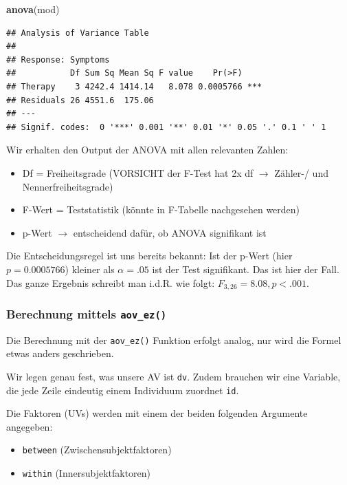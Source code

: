\documentclass[
]{book}
\newenvironment{Shaded}{\begin{snugshade}}{\end{snugshade}}
\newcommand{\FunctionTok}[1]{\textcolor[rgb]{0.13,0.29,0.53}{\textbf{#1}}}
\newcommand{\NormalTok}[1]{#1}
\providecommand{\tightlist}{%
  \setlength{\itemsep}{0pt}\setlength{\parskip}{0pt}}
\begin{document}
\begin{Shaded}
\begin{Highlighting}[]
\FunctionTok{anova}\NormalTok{(mod)}
\end{Highlighting}
\end{Shaded}

\begin{verbatim}
## Analysis of Variance Table
## 
## Response: Symptoms
##           Df Sum Sq Mean Sq F value    Pr(>F)    
## Therapy    3 4242.4 1414.14   8.078 0.0005766 ***
## Residuals 26 4551.6  175.06                      
## ---
## Signif. codes:  0 '***' 0.001 '**' 0.01 '*' 0.05 '.' 0.1 ' ' 1
\end{verbatim}

Wir erhalten den Output der ANOVA mit allen relevanten Zahlen:

\begin{itemize}
\tightlist
\item
  Df = Freiheitsgrade (VORSICHT der F-Test hat 2x df \(\rightarrow\) Zähler-/ und Nennerfreiheitsgrade)
\item
  F-Wert = Teststatistik (könnte in F-Tabelle nachgesehen werden)
\item
  p-Wert \(\rightarrow\) entscheidend dafür, ob ANOVA signifikant ist
\end{itemize}

Die Entscheidungsregel ist uns bereits bekannt: Ist der p-Wert (hier \(p=0.0005766\)) kleiner als \(\alpha=.05\) ist der Test signifikant. Das ist hier der Fall. Das ganze Ergebnis schreibt man i.d.R. wie folgt: \(F_{3,26}=8.08, p<.001\).

\subsubsection{\texorpdfstring{Berechnung mittels \texttt{aov\_ez()}}{Berechnung mittels aov\_ez()}}\label{berechnung-mittels-aov_ez}

Die Berechnung mit der \texttt{aov\_ez()} Funktion erfolgt analog, nur wird die Formel etwas anders geschrieben.

Wir legen genau fest, was unsere AV ist \texttt{dv}. Zudem brauchen wir eine Variable, die jede Zeile eindeutig einem Individuum zuordnet \texttt{id}.

Die Faktoren (UVs) werden mit einem der beiden folgenden Argumente angegeben:

\begin{itemize}
\tightlist
\item
  \texttt{between} (Zwischensubjektfaktoren)
\item
  \texttt{within} (Innersubjektfaktoren)
\end{itemize}
\end{document}
